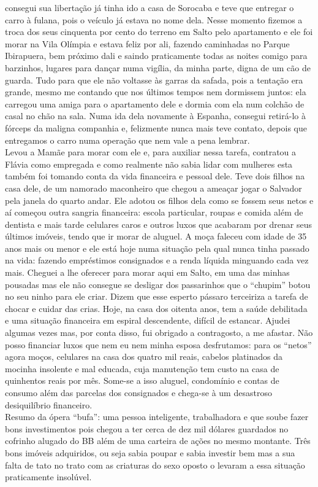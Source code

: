 \documentclass[12pt,brazil,]{book}
\begin{document}
consegui sua libertação já tinha ido a casa de Sorocaba e teve que
entregar o carro à fulana, pois o veículo já estava no nome dela. Nesse
momento fizemos a troca dos seus cinquenta por cento do terreno em Salto
pelo apartamento e ele foi morar na Vila Olímpia e estava feliz por ali,
fazendo caminhadas no Parque Ibirapuera, bem próximo dali e saindo
praticamente todas as noites comigo para barzinhos, lugares para dançar
numa vigília, da minha parte, digna de um cão de guarda. Tudo para que
ele não voltasse às garras da safada, pois a tentação era grande, mesmo
me contando que nos últimos tempos nem dormissem juntos: ela carregou
uma amiga para o apartamento dele e dormia com ela num colchão de casal
no chão na sala. Numa ida dela novamente à Espanha, consegui retirá-lo à
fórceps da maligna companhia e, felizmente nunca mais teve contato,
depois que entregamos o carro numa operação que nem vale a pena
lembrar.\\
Levou a Mamãe para morar com ele e, para auxiliar nessa tarefa,
contratou a Flávia como empregada e como realmente não sabia lidar com
mulheres esta também foi tomando conta da vida financeira e pessoal
dele. Teve dois filhos na casa dele, de um namorado maconheiro que
chegou a ameaçar jogar o Salvador pela janela do quarto andar. Ele
adotou os filhos dela como se fossem seus netos e aí começou outra
sangria financeira: escola particular, roupas e comida além de dentista
e mais tarde celulares caros e outros luxos que acabaram por drenar seus
últimos imóveis, tendo que ir morar de aluguel. A moça faleceu com idade
de 35 anos mais ou menor e ele está hoje numa situação pela qual nunca
tinha passado na vida: fazendo empréstimos consignados e a renda líquida
minguando cada vez mais. Cheguei a lhe oferecer para morar aqui em
Salto, em uma das minhas pousadas mas ele não consegue se desligar dos
passarinhos que o ``chupim'' botou no seu ninho para ele criar. Dizem
que esse esperto pássaro terceiriza a tarefa de chocar e cuidar das
crias. Hoje, na casa dos oitenta anos, tem a saúde debilitada e uma
situação financeira em espiral descendente, difícil de estancar. Ajudei
algumas vezes mas, por conta disso, fui obrigado a contragosto, a me
afastar. Não posso financiar luxos que nem eu nem minha esposa
desfrutamos: para os ``netos'' agora moços, celulares na casa dos quatro
mil reais, cabelos platinados da mocinha insolente e mal educada, cuja
manutenção tem custo na casa de quinhentos reais por mês. Some-se a isso
aluguel, condomínio e contas de consumo além das parcelas dos
consignados e chega-se à um desastroso desiquilíbrio financeiro.\\
Resumo da ópera ``bufa'': uma pessoa inteligente, trabalhadora e que
soube fazer bons investimentos pois chegou a ter cerca de dez mil
dólares guardados no cofrinho alugado do BB além de uma carteira de
ações no mesmo montante. Três bons imóveis adquiridos, ou seja sabia
poupar e sabia investir bem mas a sua falta de tato no trato com as
criaturas do sexo oposto o levaram a essa situação praticamente
insolúvel.
\end{document}
